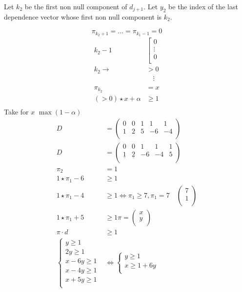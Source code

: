 \documentclass{article}
\begin{document}
Let $k_2$ be the first non null component of $d_{j+1}$. Let $y_2$ be the index of the last dependence vector whose first non null component is $k_2$.

\[\pi_{k_{2}+1}=...=\pi_{k_1-1}=0\]
\begin{align*}
k_{2}-1 & \left[ \begin{matrix}
0\\
\vdots\\
0\\
\end{matrix} \right.\\
k_2 \to & >0\\
&\quad \vdots\\
\\
\pi_{k_2}&=x\\
(>0)\star x +\alpha & \geq 1 \tag{scalar product}\\
\end{align*}
Take for $x$ $\max(1-\alpha)$
\begin{align*}
D&=\begin{pmatrix}
0&0&1&1&1\\
1&2&5&-6&-4\\
\end{pmatrix}\\
D&=\begin{pmatrix}
0&0&1&1&1\\
\underline{1}&\underline{2}&-6&-4&5\\
\end{pmatrix}\\
\pi_2 & = 1\\
1\star \pi_1-6&\geq 1\\
1\star \pi_1 - 4 &\geq 1 \Leftrightarrow \pi_1 \geq 7, \pi_1 = 7 \quad \begin{pmatrix}
7\\1\\
\end{pmatrix}\\
1\star \pi_1 + 5 &\geq 1
\pi = \begin{pmatrix}
x\\y\\
\end{pmatrix}\\
\pi \cdot d &\geq 1\\
\begin{cases}
y\geq 1\\
2y\geq 1\\
x-6y\geq 1\\
x-4y\geq 1\\
x+5y\geq 1\\
\end{cases}
& \Leftrightarrow
\begin{cases}
y\geq 1\\
x\geq 1 + 6y\\
\end{cases}
\end{align*}
\end{document}

